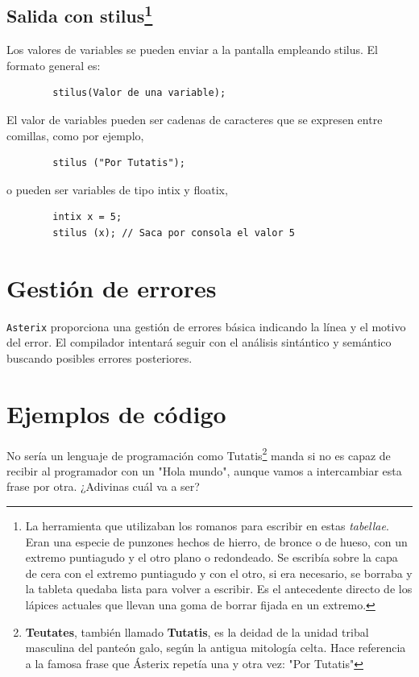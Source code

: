 \documentclass[a4paper, 10pt]{article}
\newcommand{\atx}{\texttt{Asterix} }
\begin{document}
    \subsection*{Salida con stilus\footnote{La herramienta que utilizaban los
    romanos para escribir en estas \textit{tabellae}. Eran una especie de
    punzones hechos de hierro, de bronce o de hueso, con un extremo puntiagudo
    y el otro plano o redondeado. Se escribía sobre la capa de cera con el
    extremo puntiagudo y con el otro, si era necesario, se borraba y la tableta
    quedaba lista para volver a escribir. Es el antecedente directo de los
    lápices actuales que llevan una goma de borrar fijada en un extremo.}}
    
     Los valores de variables se pueden enviar a la pantalla empleando
     \textsf{stilus}. El formato general es:
    
    \begin{verbatim}
        stilus(Valor de una variable);
    \end{verbatim}
    
    El valor de variables pueden ser cadenas de caracteres que se expresen
    entre comillas, como por ejemplo, 
    
    \begin{verbatim}
        stilus ("Por Tutatis");
    \end{verbatim}
    
    o pueden ser variables de tipo \textsf{intix} y \textsf{floatix},
    
    \begin{verbatim}
        intix x = 5;
        stilus (x); // Saca por consola el valor 5
    \end{verbatim}

    \section*{Gestión de errores}
    \atx proporciona una gestión de errores básica indicando la línea y el motivo
    del error. El compilador intentará seguir con el análisis sintántico y semántico
    buscando posibles errores posteriores.

    \section*{Ejemplos de código}
    No sería un lenguaje de programación como
    Tutatis\footnote{\textbf{Teutates}, también llamado \textbf{Tutatis}, es la
    deidad de la unidad tribal masculina del panteón galo, según la antigua
    mitología celta. Hace referencia a la famosa frase que Ásterix repetía una
    y otra vez: "Por Tutatis"} manda si no es capaz de recibir al programador
    con un "Hola mundo", aunque vamos a intercambiar esta frase por otra.
    ¿Adivinas cuál va a ser?
    
\end{document}
